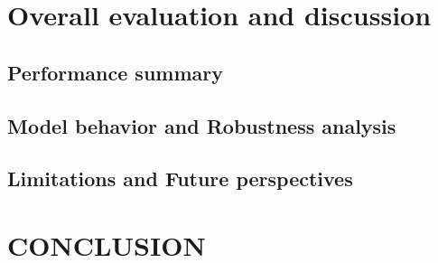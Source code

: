 \documentclass[preprint,12pt]{elsarticle}
\begin{document}
\section{Overall evaluation and discussion}
\label{sec:evaluation}

\subsection{Performance summary}


\subsection{Model behavior and Robustness analysis}

\subsection{Limitations and Future perspectives}

\section{CONCLUSION}
\label{sec:conclusion}

\end{document}
